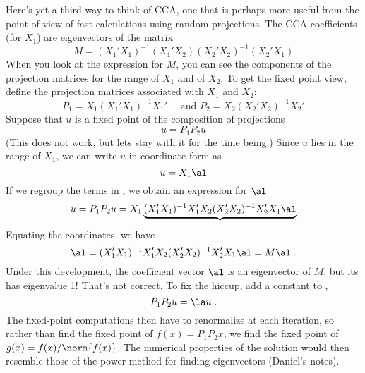 \documentclass[12pt]{article}
\begin{document}
 Here's yet a third way to think of CCA, one that is perhaps more useful from
 the point of view of fast calculations using random projections.
 The CCA coefficients (for $X_1$) are eigenvectors of the matrix
 \begin{displaymath}
   M = (X_1'X_1)^{-1} (X_1'X_2) (X_2'X_2)^{-1} (X_2'X_1)     
 \end{displaymath}
 When you look at the expression for $M$, you can see the components of the
 projection matrices for the range of $X_1$ and of $X_2$.  To get the fixed
 point view, define the projection matrices associated with $X_1$ and $X_2$:
 \begin{displaymath}
   P_1 = X_1 (X_1'X_1)^{-1} X_1'  \quad \mbox{ and } P_2 = X_2 (X_2'X_2)^{-1} X_2'     
 \end{displaymath}
 Suppose that $u$ is a fixed point of the composition of projections
 \begin{equation}
    u = P_1 P_2 u
 \label{eq:fixedpoint}
 \end{equation}
 (This does not work, but lets stay with it for the time being.)  Since $u$ lies
 in the range of $X_1$, we can write $u$ in coordinate form as
 \begin{displaymath}
     u = X_1 \al
 \end{displaymath} 
 If we regroup the terms in , we obtain an expression for $\al$
 \begin{displaymath}
   u = P_1 P_2 u =  X_1 \underbrace{ (X_1'X_1)^{-1} X_1'X_2 (X_2'X_2)^{-1} X_2' X_1 \al }
 \end{displaymath}
 Equating the coordinates, we have
 \begin{displaymath}
    \al = (X_1'X_1)^{-1} X_1'X_2 (X_2'X_2)^{-1} X_2'X_1 \al = M \al \;.
 \end{displaymath}
 Under this development, the coefficient vector $\al$ is an eigenvector of $M$,
 but its has eigenvalue 1!  That's not correct. To fix the hiccup, add a
 constant to ,
 \begin{displaymath}
    P_1 P_2 u = \la u \;.   
 \end{displaymath}
 The fixed-point computations then have to renormalize at each iteration, so
 rather than find the fixed point of $f(x) = P_1 P_2 x$, we find the fixed point
 of $g(x) = f(x)/\norm{f(x)}$.  The numerical properties of the solution would then resemble
 those of the power method for finding eigenvectors (Daniel's notes).






\end{document}
